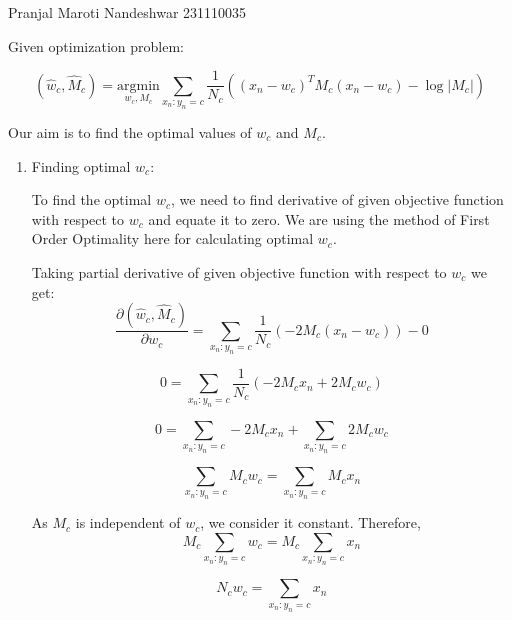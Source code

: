 \documentclass[a4paper,11pt]{article}
\begin{document}
{Pranjal Maroti Nandeshwar}   %
{231110035}	%

\begin{mlsolution}


	
     Given optimization problem:
	
	\begin{equation*}
		(\hat{w}_c, \hat{M}_c) = \underset{w_c, M_c}{\text{argmin}} \sum_{x_n: y_n = c} \frac{1}{N_c} \left((x_n - w_c)^T M_c (x_n - w_c) - \log |M_c|\right)
	\end{equation*}
	
	
	Our aim is to find the optimal values of $ w_c $ and $ M_c $.
	 
	\begin{enumerate}
		\item Finding optimal $ w_c $:
		
		To find the optimal $ w_c $, we need to find derivative of given objective function with respect to $ w_c $ and equate it to zero.
		We are using the method of First Order Optimality here for calculating optimal $w_c$.
		
		Taking partial derivative of given objective function with respect to $w_c$ we get:	
		\begin{equation*}
		\frac{\partial (\hat{w}_c,\hat{M}_c)}{\partial w_c} = \sum_{x_n: y_n = c} \frac{1}{N_c} \left(-2M_c(x_n-w_c)\right) - 0
		\end{equation*}
		
		\begin{equation*}
		0 =	\sum_{x_n: y_n = c} \frac{1}{N_c} \left(-2M_cx_n + 2M_cw_c\right)
		\end{equation*}
		
		\begin{equation*}
		   0 =   \sum_{x_n: y_n = c}  -2M_cx_n + \sum_{x_n: y_n = c} 2M_cw_c 
		\end{equation*}
		
		\begin{equation*}
		\sum_{x_n: y_n = c} M_cw_c  = \sum_{x_n: y_n = c}  M_cx_n 
		\end{equation*}
		
		As $M_c$ is independent of $w_c$, we consider it constant.
		Therefore,
		\begin{equation*}
			M_c\sum_{x_n: y_n = c} w_c  = M_c\sum_{x_n: y_n = c}  x_n 
		\end{equation*}
		
		\begin{equation*}
			N_cw_c  = \sum_{x_n: y_n = c}  x_n 
		\end{equation*}
		

\end{enumerate}
\end{mlsolution}
\end{document}
